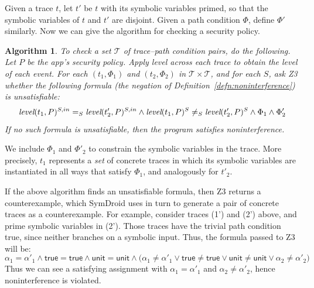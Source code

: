 \documentclass{llncs}
\newcommand{\code}[1]{\textsf{#1}} %
\newtheorem{algorithm}{Algorithm}
\newcommand{\sfmt}[1]{\textsf{#1}}
\newcommand{\sunit}{\sfmt{unit}}
\newcommand{\tr}{t\xspace}
\newcommand{\tset}{\ensuremath{\mathcal{T}}\xspace}
\newcommand{\tleveltr}[2]{\textit{level}(#1, #2)}
\begin{document}
Given a trace
$t$, let $t'$ be $t$ with its symbolic variables primed, so that the
symbolic variables of $t$ and $t'$ are disjoint. Given a path
condition $\Phi$, define $\Phi'$ similarly. Now we can give the
algorithm for checking a security policy.

\begin{algorithm}
  To check a set $\tset$ of trace--path condition pairs, do the
  following. Let $P$ be the app's security policy. Apply \emph{level}
  across each trace to obtain the level of each event.  For each
  $(t_1, \Phi_1)$ and $(t_2, \Phi_2)$ in $\tset\times\tset$, and for
  each $S$, ask Z3 whether the following formula (the negation of
  Definition~\ref{defn:noninterference}) is unsatisfiable:
  \begin{displaymath}
      \tleveltr{\tr_1}{P}^{S,in} =_S \tleveltr{\tr_2'}{P}^{S,in} \land
      \tleveltr{\tr_1}{P}^S \neq_S \tleveltr{\tr_2'}{P}^S \land
      \Phi_1 \land \Phi_2' \\
  \end{displaymath}
  If no such formula is unsatisfiable, then the program satisfies noninterference.
\end{algorithm}
%
We include $\Phi_1$ and $\Phi'_2$ to
constrain the symbolic variables in the trace. More precisely,
$\tr_1$ represents a \emph{set} of concrete traces in which its symbolic
variables are instantiated in all ways that satisfy $\Phi_1$,
and analogously for $\tr'_2$.

If the above algorithm finds an unsatisfiable formula, then Z3 returns a counterexample, which
SymDroid uses in turn to generate a pair of concrete traces
as a counterexample.
For example, consider traces (1') and (2') above, and prime
symbolic variables in (2'). Those traces have the trivial path
condition \sfmt{true}, since neither branches on a symbolic
input. Thus, the formula passed to Z3 will be:
\begin{displaymath}
    \alpha_1 = \alpha'_1 \land \code{true} = \code{true} \land \sunit = \sunit
    \land
    \big(\alpha_1 \neq \alpha'_1 \vee \code{true} \neq \code{true} \vee
    \sunit \neq \sunit \vee \alpha_2 \neq \alpha'_2 \big)
\end{displaymath}
Thus we can see a satisfying
assignment with $\alpha_1 = \alpha'_1$ and $\alpha_2 \neq \alpha'_2$,
hence noninterference is violated.
\end{document}

